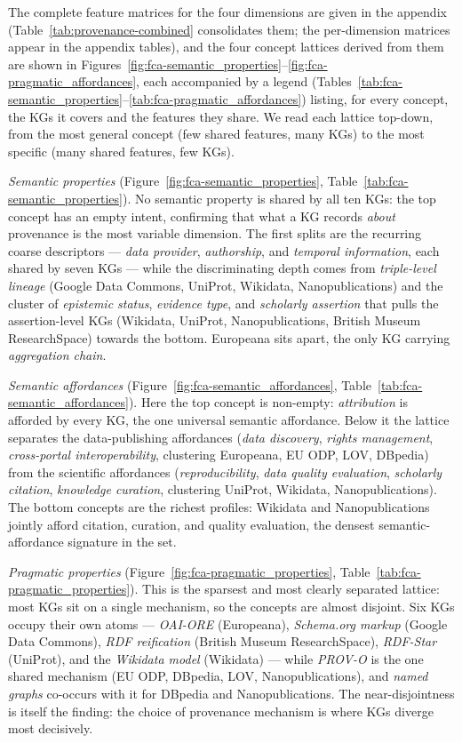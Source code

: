 \documentclass[runningheads]{llncs}
\newenvironment{onlyextended}{\ignorespaces}{\ignorespacesafterend}
\begin{document}
\begin{onlyextended}
The complete feature matrices for the four dimensions are given in the
appendix (Table~\ref{tab:provenance-combined} consolidates them; the
per-dimension matrices appear in the appendix tables), and the four
concept lattices derived from them are shown in
Figures~\ref{fig:fca-semantic_properties}--\ref{fig:fca-pragmatic_affordances},
each accompanied by a legend
(Tables~\ref{tab:fca-semantic_properties}--\ref{tab:fca-pragmatic_affordances})
listing, for every concept, the KGs it covers and the features they share.
We read each lattice top-down, from the most general concept (few shared
features, many KGs) to the most specific (many shared features, few KGs).

\emph{Semantic properties} (Figure~\ref{fig:fca-semantic_properties},
Table~\ref{tab:fca-semantic_properties}). No semantic property is shared by
all ten KGs: the top concept has an empty intent, confirming that what a KG
records \emph{about} provenance is the most variable dimension. The first
splits are the recurring coarse descriptors --- \emph{data provider},
\emph{authorship}, and \emph{temporal information}, each shared by seven KGs
--- while the discriminating depth comes from \emph{triple-level lineage}
(Google Data Commons, UniProt, Wikidata, Nanopublications) and the cluster
of \emph{epistemic status}, \emph{evidence type}, and \emph{scholarly
assertion} that pulls the assertion-level KGs (Wikidata, UniProt,
Nanopublications, British Museum ResearchSpace) towards the bottom. Europeana
sits apart, the only KG carrying \emph{aggregation chain}.

\emph{Semantic affordances} (Figure~\ref{fig:fca-semantic_affordances},
Table~\ref{tab:fca-semantic_affordances}). Here the top concept is non-empty:
\emph{attribution} is afforded by every KG, the one universal semantic
affordance. Below it the lattice separates the data-publishing affordances
(\emph{data discovery}, \emph{rights management}, \emph{cross-portal
interoperability}, clustering Europeana, EU ODP, LOV, DBpedia) from the
scientific affordances (\emph{reproducibility}, \emph{data quality
evaluation}, \emph{scholarly citation}, \emph{knowledge curation}, clustering
UniProt, Wikidata, Nanopublications). The bottom concepts are the richest
profiles: Wikidata and Nanopublications jointly afford citation, curation,
and quality evaluation, the densest semantic-affordance signature in the set.

\emph{Pragmatic properties} (Figure~\ref{fig:fca-pragmatic_properties},
Table~\ref{tab:fca-pragmatic_properties}). This is the sparsest and most
clearly separated lattice: most KGs sit on a single mechanism, so the
concepts are almost disjoint. Six KGs occupy their own atoms ---
\emph{OAI-ORE} (Europeana), \emph{Schema.org markup} (Google Data Commons),
\emph{RDF reification} (British Museum ResearchSpace), \emph{RDF-Star}
(UniProt), and the \emph{Wikidata model} (Wikidata) --- while \emph{PROV-O}
is the one shared mechanism (EU ODP, DBpedia, LOV, Nanopublications), and
\emph{named graphs} co-occurs with it for DBpedia and Nanopublications. The
near-disjointness is itself the finding: the choice of provenance mechanism
is where KGs diverge most decisively.


\end{onlyextended}
\end{document}
